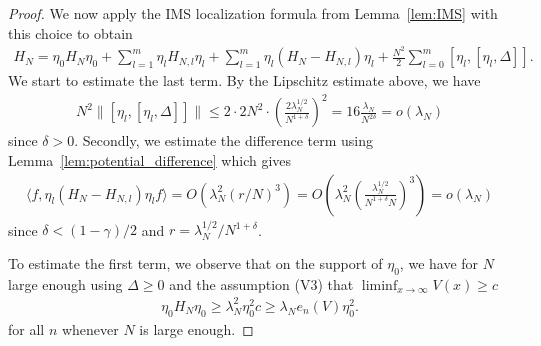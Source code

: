 \documentclass[10pt,a4paper]{amsart}
\begin{document}
\begin{proof}
    
    We now apply the IMS localization formula from Lemma~\ref{lem:IMS} with this choice  to obtain
    \begin{align*}
        H_N = \eta_0 H_N \eta_0+ \sum_{l=1}^m \eta_l H_{N,l} \eta_l +  \sum_{l=1}^m \eta_l (H_N- H_{N,l}) \eta_l+ \frac{N^2}2\sum_{l=0}^m [\eta_l,[\eta_l,\Delta]].
    \end{align*}
We start to estimate the last term. By the Lipschitz estimate above, we have
    \begin{align*}
        N^2\| [\eta_l,[  \eta_l,\Delta]]\|\leq 2\cdot 2N^2\cdot \left(\frac{2\lambda_N^{1/2}}{N^{1+\delta}}\right)^2=  16\frac{\lambda_N}{N^{2\delta}}=o(\lambda_N)
    \end{align*}
    since $\delta>0$. Secondly, we estimate the difference term using Lemma~\ref{lem:potential_difference} which gives
    \begin{align*}
       \langle f, \eta_l (H_N- H_{N,l}) \eta_l f\rangle = O(\lambda_N^2(r/N)^3) = O\left(\lambda_N^2\left(\frac{\lambda_N^{1/2}}{N^{1+\delta}N}\right)^3\right) = o(\lambda_N)
    \end{align*}
    since $\delta<(1-\gamma)/2$ and $r={\lambda_N^{1/2}}/{N^{1+\delta}} $.

   To estimate the first term, we observe that on the support of $\eta_0$, we have for $N$ large enough using $\Delta\geq0$ and the assumption (V3) that $\liminf_{x\to\infty}V(x)\ge c$
    \begin{align*}
        \eta_0 H_N \eta_0 \geq \lambda_N^2 \eta_0^2 c \geq \lambda_N e_n(V) \eta_0^2.
    \end{align*}
    for all $n$ whenever $N$ is large enough.


\end{proof}
\end{document}
